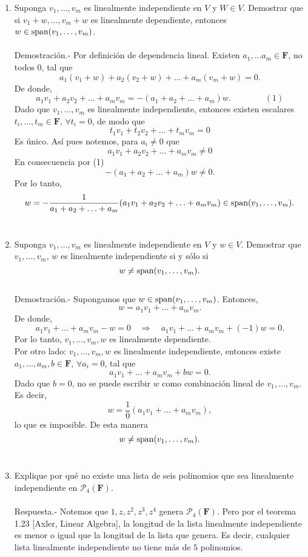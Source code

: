 \begin{enumerate}[\bfseries 1.]
    \item Suponga $v_1,\ldots,v_m$ es linealmente independiente en $V$ y $W\in V$. Demostrar que si $v_1+w,\ldots,v_m+w$ es linealmente dependiente, entonces $w\in \mathop{\mbox{\normalfont span}}\nolimits(v_1,\ldots,v_m)$.\\\\
	Demostración.-\; Por definición de dependencia lineal. Existen $a_1,\ldots a_m \in \textbf{F}$, no todos $0$, tal que 
	$$a_1(v_1+w)+a_2(v_2+w)+\ldots+a_m(v_m+w)=0.$$
	De donde,
	$$a_1v_1+a_2v_2+\ldots+a_mv_m=-(a_1+a_2+\ldots+a_m)w. \qquad \qquad (1)$$
	Dado que $v_1,\ldots,v_m$ es linealmente independiente, entonces existen escalares $t_i,\ldots,t_m\in \textbf{F}$, $\forall t_i=0$, de modo que
	$$t_1v_1+t_2v_2+\ldots+t_mv_m=0$$
	Es único. Así pues notemos, para $a_i\neq 0$ que
	$$a_1v_1+a_2v_2+\ldots+a_mv_m\neq 0$$
	En consecuencia por (1)
	$$-(a_1+a_2+\ldots+a_m)w\neq 0.$$
	Por lo tanto,
	$$w=-\frac{1}{a_1+a_2+\ldots+a_m}(a_1v_1+a_2v_2+\ldots+a_mv_m)\in \mathop{\mbox{\normalfont span}}\nolimits(v_1,\ldots,v_m).$$\\

    \item Suponga $v_1,\ldots,v_m$ es linealmente independiente en $V$ y $w\in V$. Demostrar que $v_1,\ldots,v_m$, $w$ es linealmente independiente si y sólo si 
    $$w\neq \mathop{\mbox{\normalfont span}}\nolimits(v_1,\ldots,v_m).$$\\
	Demostración.-\; Supongamos que $w\in \mathop{\mbox{\normalfont span}}\nolimits(v_1,\ldots,v_m)$. Entonces,
	$$w=a_1v_1+\ldots+a_mv_m.$$
	De donde,
	$$a_1v_1+\ldots+a_mv_m-w=0\quad \Rightarrow \quad a_1v_1+\ldots+a_mv_m+(-1)w=0.$$
	Por lo tanto, $v_1,\ldots,v_m,w$ es linealmente dependiente.\\

	Por otro lado: $v_1,\ldots,v_m,w$ es linealmente independiente, entonces existe $a_1,\ldots,a_m,b\in \textbf{F}$, $\forall a_i=0$, tal que
	$$a_1v_1+\ldots+a_mv_m+bw=0.$$
	Dado que $b=0$, no se puede escribir $w$ como combinación lineal de $v_1,\ldots,v_m$. Es decir,
	$$w=\dfrac{1}{0}(a_1v_1+\ldots+a_mv_m),$$
	lo que es imposible. De esta manera
	$$w\neq \mathop{\mbox{\normalfont span}}\nolimits(v_1,\ldots,v_m).$$\\


    \item Explique por qué no existe una lista de seis polinomios que sea linealmente independiente en $\mathcal{P}_4(\textbf{F})$.\\\\
	Respuesta.-\; Notemos que $1,z,z^2,z^3,z^4$ genera $\mathcal{P}_4(\textbf{F})$. Pero por el teorema 1.23 [Axler, Linear Algebra], la longitud de la lista linealmente independiente es menor o igual que la longitud de la lista que genera. Es decir, cualquier lista linealmente independiente no tiene más de $5$ polinomios.\\\\


\end{enumerate}
